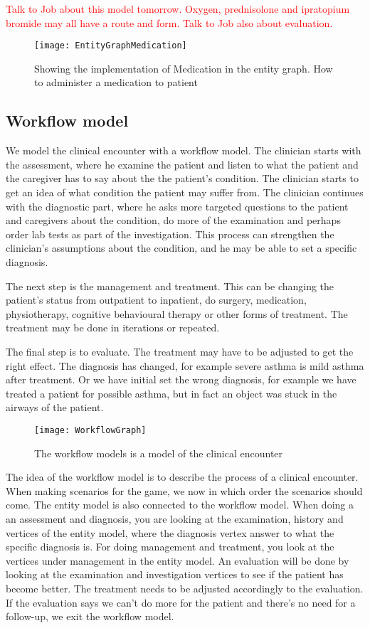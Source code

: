 
 \textcolor{red}{Talk to Job about this model tomorrow. Oxygen, prednisolone and ipratopium bromide may all have a route and form. Talk to Job also about evaluation.}
\begin{figure}[h!]
	\caption {Showing the implementation of Medication in the entity graph. How to administer a medication to patient}
	\label{fig:EntityGraphMedication}
	\texttt{[image: EntityGraphMedication]}
\end{figure}





\subsection{Workflow model}
We model the clinical encounter with a workflow model. The clinician starts with the assessment, where he examine the patient and listen to what the patient and the caregiver has to say about the the patient's condition. The clinician starts to get an idea of what condition the patient may suffer from. The clinician continues with the diagnostic part, where he asks more targeted questions to the patient and caregivers about the condition, do more of the examination and perhaps order lab tests as part of the investigation. This process can strengthen the clinician's assumptions about the condition, and he may be able to set a specific diagnosis.

The next step is the management and treatment. This can be changing the patient's status from outpatient to inpatient, do surgery, medication, physiotherapy, cognitive behavioural therapy or other forms of treatment. The treatment may be done in iterations or repeated.


The final step is to evaluate. The treatment may have to be adjusted to get the right effect. The diagnosis has changed, for example severe asthma is mild asthma after treatment. Or we have initial set the wrong diagnosis, for example we have treated a patient for possible asthma, but in fact an object was stuck in the airways of the patient.


\begin{figure}[h!]
	\caption {The workflow models is a model of the clinical encounter}
	\label{fig:WorkflowGraph}
	\texttt{[image: WorkflowGraph]}
\end{figure}

The idea of the workflow model is to describe the process of a clinical encounter. When making scenarios for the game, we now in which order the scenarios should come. The entity model is also connected to the workflow model. When doing a an assessment and diagnosis, you are looking at the examination, history and vertices of the entity model, where the diagnosis vertex answer to what the specific diagnosis is. For doing management and treatment, you look at the vertices under management in the entity model. An evaluation will be done by looking at the examination and investigation vertices to see if the patient has become better. The treatment needs to be adjusted accordingly to the evaluation. If the evaluation says we can't do more for the patient and there's no need for a follow-up, we exit the workflow model.

